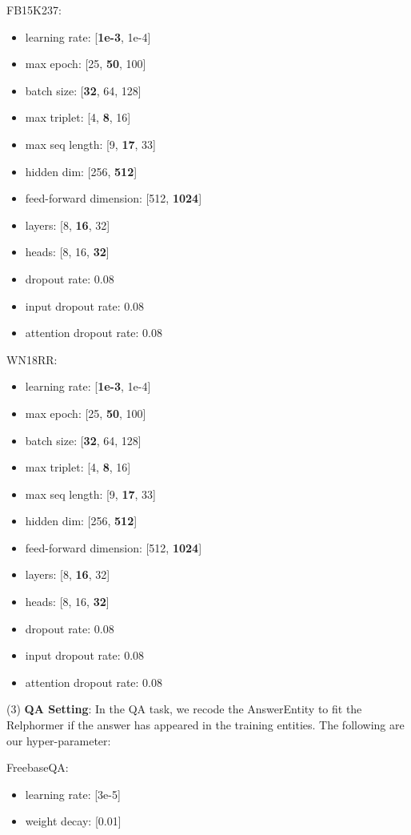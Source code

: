 \documentclass[sigconf]{acmart}
\begin{document}
FB15K237:
\begin{itemize}
\item learning rate: [\textbf{1e-3}, 1e-4]
\item max epoch: 
[25, \textbf{50}, 100]
\item batch size: [\textbf{32}, 64, 128]
\item max triplet: [4, \textbf{8}, 16]
\item max seq length: [9, \textbf{17}, 33]
\item hidden dim: [256, \textbf{512}]
\item feed-forward dimension: [512, \textbf{1024}]
\item layers: [8, \textbf{16}, 32]
\item heads: [8, 16, \textbf{32}]
\item dropout rate: 0.08
\item input dropout rate: 0.08
\item attention dropout rate: 0.08
\end{itemize}

WN18RR:
\begin{itemize}
\item learning rate: [\textbf{1e-3}, 1e-4]
\item max epoch: 
[25, \textbf{50}, 100]
\item batch size: [\textbf{32}, 64, 128]
\item max triplet: [4, \textbf{8}, 16]
\item max seq length: [9, \textbf{17}, 33]
\item hidden dim: [256, \textbf{512}]
\item feed-forward dimension: [512, \textbf{1024}]
\item layers: [8, \textbf{16}, 32]
\item heads: [8, 16, \textbf{32}]
\item dropout rate: 0.08
\item input dropout rate: 0.08
\item attention dropout rate: 0.08
\end{itemize}

(3) \textbf{QA Setting}: 
In the QA task, we recode the AnswerEntity to fit the Relphormer if the answer has appeared in the training entities. The following are our hyper-parameter:

FreebaseQA:
\begin{itemize}
\item learning rate: [3e-5]
\item weight decay: [0.01]
\end{itemize}
\end{document}

